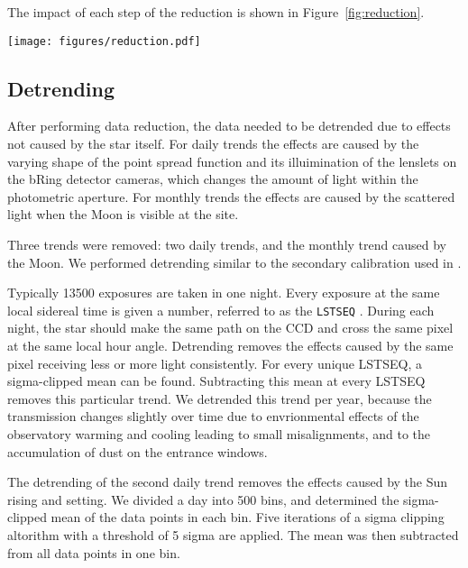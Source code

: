 \documentclass{aa}
\begin{document}
The impact of each step of the reduction is shown in Figure~\ref{fig:reduction}.

\begin{figure*}
    \centering
    \texttt{[image: figures/reduction.pdf]}
    \caption{The first three steps of the data reduction are shown here. The first plot shows the raw data that was saved by bRing. The second plot shows the data without the long exposures. Lastly, the data without the bad photometry and astrometry flags is plotted. The time is displayed on the horizontal axis in Julian Date and the apparent magnitude is displayed on the vertical axis.}
    \label{fig:reduction}
\end{figure*}

\subsection{Detrending}

After performing data reduction, the data needed to be detrended due to effects not caused by the star itself.
%
For daily trends the effects are caused by the varying shape of the point spread function and its illuimination of the lenslets on the bRing detector cameras, which changes the amount of light within the photometric aperture.
%
For monthly trends the effects are caused by the scattered light when the Moon is visible at the site.

Three trends were removed: two daily trends, and the monthly trend caused by the Moon.
%
We performed detrending similar to the secondary calibration used in \cite{Talens_2018}.

Typically 13500 exposures are taken in one night.
%
Every exposure at the same local sidereal time is given a number, referred to as the {\tt LSTSEQ} \citep{Talens_2018}.
%
During each night, the star should make the same path on the CCD and cross the same pixel at the same local hour angle.
%
Detrending removes the effects caused by the same pixel receiving less or more light consistently.
%
For every unique LSTSEQ, a sigma-clipped mean can be found.
%
Subtracting this mean at every LSTSEQ removes this particular trend.
%
We detrended this trend per year, because the transmission changes slightly over time due to envrionmental effects of the observatory warming and cooling leading to small misalignments, and to the accumulation of dust on the entrance windows.




The detrending of the second daily trend removes the effects caused by the Sun rising and setting.
%
We divided a day into 500 bins, and determined the sigma-clipped mean of the data points in each bin.
%
Five iterations of a sigma clipping altorithm with a threshold of 5 sigma are applied.
%
%
The mean was then subtracted from all data points in one bin.
\end{document}
